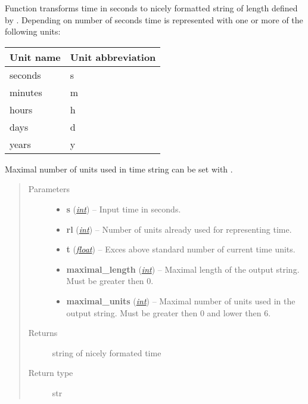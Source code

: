\documentclass[a4paper,10pt,english]{sphinxmanual}
\begin{document}
\begin{fulllineitems}
\label{aqueduct.utils.log:aqueduct.utils.log.smart_time_string}
Function transforms time in seconds to nicely formatted string of
length defined by . Depending on number of seconds time is represented with
one or more of the following units:

\begin{tabulary}{\linewidth}{|L|L|}
\hline
\textsf{\relax 
Unit name
} & \textsf{\relax 
Unit abbreviation
}\\
\hline
seconds
 & 
s
\\
\hline
minutes
 & 
m
\\
\hline
hours
 & 
h
\\
\hline
days
 & 
d
\\
\hline
years
 & 
y
\\
\hline\end{tabulary}


Maximal number of units used in time string can be set with .
\begin{quote}\begin{description}
\item[{Parameters}] \leavevmode\begin{itemize}
\item {} 
\textbf{s} (\href{http://docs.python.org/2/library/functions.html\#int}{\emph{int}}) -- Input time in seconds.

\item {} 
\textbf{rl} (\href{http://docs.python.org/2/library/functions.html\#int}{\emph{int}}) -- Number of units already used for representing time.

\item {} 
\textbf{t} (\href{http://docs.python.org/2/library/functions.html\#float}{\emph{float}}) -- Exces above standard number of current time units.

\item {} 
\textbf{maximal\_length} (\href{http://docs.python.org/2/library/functions.html\#int}{\emph{int}}) -- Maximal length of the output string. Must be greater then 0.

\item {} 
\textbf{maximal\_units} (\href{http://docs.python.org/2/library/functions.html\#int}{\emph{int}}) -- Maximal number of units used in the output string. Must be greater then 0 and lower then 6.

\end{itemize}

\item[{Returns}] \leavevmode
string of nicely formated time

\item[{Return type}] \leavevmode
str

\end{description}\end{quote}

\end{fulllineitems}
\end{document}
